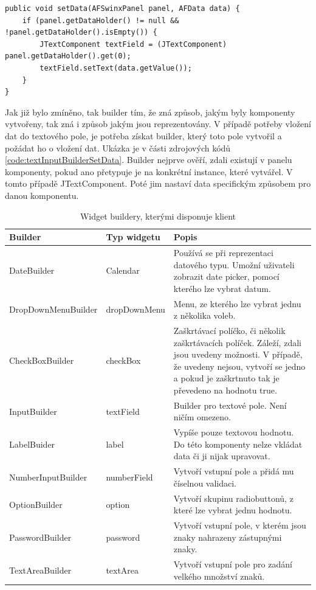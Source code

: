 \begin{lstlisting}[caption={Vložení dat do vstupního pole vytvořeného builderem.},
label={code:textInputBuilderSetData}]
public void setData(AFSwinxPanel panel, AFData data) {
	if (panel.getDataHolder() != null && !panel.getDataHolder().isEmpty()) {
		JTextComponent textField = (JTextComponent) panel.getDataHolder().get(0);
		textField.setText(data.getValue());
	}
}
\end{lstlisting}

Jak již bylo zmíněno, tak builder tím, že zná způsob, jakým byly komponenty vytvořeny, tak zná i způsob jakým jsou reprezentovány. V případě potřeby vložení dat do textového pole, je potřeba získat builder, který toto pole vytvořil a požádat ho o vložení dat. Ukázka je v části zdrojových kódů \ref{code:textInputBuilderSetData}. Builder nejprve ověří, zdali existují v panelu komponenty, pokud ano přetypuje je na konkrétní instance, které vytvářel. V tomto případě JTextComponent. Poté jim nastaví data specifickým způsobem pro danou komponentu.


\begin{table}[width=\linewidth]
\begin{center}
\caption{Widget buildery, kterými disponuje klient}
\label{table:widgetBuilders}
\begin{tabular}{|p{4cm}|p{3cm}|p{7cm}|}
\hline
\textbf{Builder} & \textbf{Typ widgetu} & \textbf{Popis} \\
\hline
DateBuilder & 
Calendar & Používá se při reprezentaci datového typu. Umožní uživateli zobrazit date picker, pomocí kterého lze vybrat datum. \\
\hline
DropDownMenuBuilder &
dropDownMenu & Menu, ze kterého lze vybrat jednu z několika voleb. \\
\hline
CheckBoxBuilder & checkBox &
Zaškrtávací políčko, či několik zaškrtávacích políček. Záleží, zdali jsou uvedeny možnosti. V případě, že uvedeny nejsou, vytvoří se jedno a pokud je zaškrtnuto tak je převedeno na hodnotu true. \\
\hline
InputBuilder & textField &
Builder pro textové pole. Není ničím omezeno. \\
\hline
LabelBuider & label &
Vypíše pouze textovou hodnotu. Do této komponenty nelze vkládat data či ji nijak upravovat. \\
\hline
NumberInputBuilder & numberField &
Vytvoří vstupní pole a přidá mu číselnou validaci. \\
\hline
OptionBuilder & option &
Vytvoří skupinu radiobuttonů, z které lze vybrat jednu hodnotu. \\
\hline
PasswordBuilder & password &
Vytvoří vstupní pole, v kterém jsou znaky nahrazeny zástupnými znaky. \\
\hline
TextAreaBuilder & textArea &
Vytvoří vstupní pole pro zadání velkého množství znaků. \\
\hline
\end{tabular}
\end{center}
\end{table}


